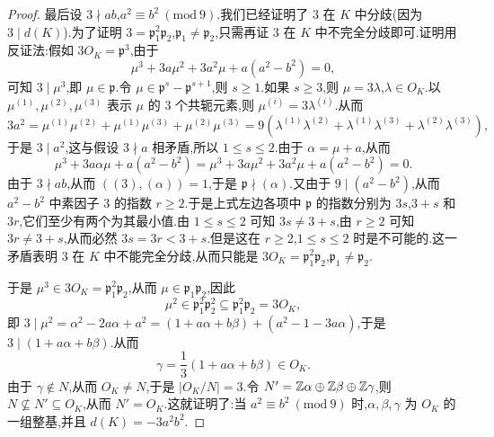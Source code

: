\begin{proof}
最后设 $3\nmid ab$,$a^2\equiv b^2\ (\mathrm{mod}\ 9)$.我们已经证明了 $3$ 在 $K$ 中分歧(因为 $3\mid d(K)$).为了证明 $3=\mathfrak{p}_1^2\mathfrak{p}_2$,$\mathfrak{p}_1\neq\mathfrak{p}_2$,只需再证 $3$ 在 $K$ 中不完全分歧即可.证明用反证法:假如 $3O_K=\mathfrak{p}^3$,由于
\[
  \mu^3+3a\mu^2+3a^2\mu+a(a^2-b^2)=0,
\]
可知 $3\mid\mu^3$,即 $\mu\in\mathfrak{p}$.令 $\mu\in\mathfrak{p}^s-\mathfrak{p}^{s+1}$,则 $s\geqslant 1$.如果 $s\geqslant 3$,则 $\mu=3\lambda$,$\lambda\in O_K$.以 $\mu^{(1)},\mu^{(2)},\mu^{(3)}$ 表示 $\mu$ 的 $3$ 个共轭元素,则 $\mu^{(i)}=3\lambda^{(i)}$.从而
\[
  3a^2=\mu^{(1)}\mu^{(2)}+\mu^{(1)}\mu^{(3)}+\mu^{(2)}\mu^{(3)}
  =9(\lambda^{(1)}\lambda^{(2)}+\lambda^{(1)}\lambda^{(3)}+\lambda^{(2)}\lambda^{(3)}),
\]
于是 $3\mid a^2$,这与假设 $3\nmid a$ 相矛盾,所以 $1\leqslant s\leqslant 2$.由于 $\alpha=\mu+a$,从而
\[
  \mu^3+3a\alpha\mu+a(a^2-b^2)=\mu^3+3a\mu^2+3a^2\mu+a(a^2-b^2)=0.
\]
由于 $3\nmid ab$,从而 $((3),(\alpha))=1$,于是 $\mathfrak{p}\nmid(\alpha)$.又由于 $9\mid(a^2-b^2)$,从而 $a^2-b^2$ 中素因子 $3$ 的指数 $r\geqslant 2$.于是上式左边各项中 $\mathfrak{p}$ 的指数分别为 $3s$,$3+s$ 和 $3r$,它们至少有两个为其最小值.由 $1\leqslant s\leqslant 2$ 可知 $3s\neq 3+s$,由 $r\geqslant 2$ 可知 $3r\neq 3+s$,从而必然 $3s=3r<3+s$.但是这在 $r\geqslant 2$,$1\leqslant s\leqslant 2$ 时是不可能的.这一矛盾表明 $3$ 在 $K$ 中不能完全分歧,从而只能是 $3O_K=\mathfrak{p}_1^2\mathfrak{p}_2$,$\mathfrak{p}_1\neq\mathfrak{p}_2$.

于是 $\mu^3\in 3O_K=\mathfrak{p}_1^2\mathfrak{p}_2$,从而 $\mu\in\mathfrak{p}_1\mathfrak{p}_2$,因此
\[
  \mu^2\in\mathfrak{p}_1^2\mathfrak{p}_2^2\subseteq\mathfrak{p}_1^2\mathfrak{p}_2=3O_K,
\]
即 $3\mid\mu^2=\alpha^2-2a\alpha+a^2=(1+a\alpha+b\beta)+(a^2-1-3a\alpha)$,于是 $3\mid(1+a\alpha+b\beta)$.从而
\[
  \gamma=\frac{1}{3}(1+a\alpha+b\beta)\in O_K.
\]
由于 $\gamma\notin N$,从而 $O_K\neq N$,于是 $|O_K/N|=3$.令 $N'=\mathbb{Z}\alpha\oplus\mathbb{Z}\beta\oplus\mathbb{Z}\gamma$,则 $N\not\subseteq N'\subseteq O_K$,从而 $N'=O_K$.这就证明了:当 $a^2\equiv b^2\ (\mathrm{mod}\ 9)$ 时,$\alpha,\beta,\gamma$ 为 $O_K$ 的一组整基,并且 $d(K)=-3a^2b^2$.
\end{proof}

